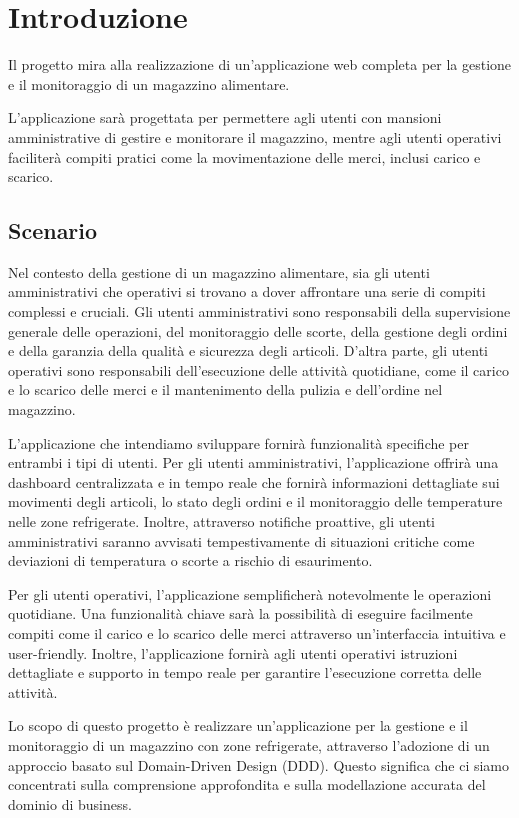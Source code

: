 \section{Introduzione}

Il progetto mira alla realizzazione di un'applicazione web completa per la gestione e il monitoraggio di un magazzino alimentare.

L'applicazione sarà progettata per permettere agli utenti con mansioni amministrative di gestire e monitorare il magazzino, mentre agli utenti operativi faciliterà compiti pratici come la movimentazione delle merci, inclusi carico e scarico.

\subsection{Scenario}

Nel contesto della gestione di un magazzino alimentare, sia gli utenti amministrativi che operativi si trovano a dover affrontare una serie di compiti complessi e cruciali. Gli utenti amministrativi sono responsabili della supervisione generale delle operazioni, del monitoraggio delle scorte, della gestione degli ordini e della garanzia della qualità e sicurezza degli articoli. D'altra parte, gli utenti operativi sono responsabili dell'esecuzione delle attività quotidiane, come il carico e lo scarico delle merci e il mantenimento della pulizia e dell'ordine nel magazzino.

L'applicazione che intendiamo sviluppare fornirà funzionalità specifiche per entrambi i tipi di utenti. Per gli utenti amministrativi, l'applicazione offrirà una dashboard centralizzata e in tempo reale che fornirà informazioni dettagliate sui movimenti degli articoli, lo stato degli ordini e il monitoraggio delle temperature nelle zone refrigerate. Inoltre, attraverso notifiche proattive, gli utenti amministrativi saranno avvisati tempestivamente di situazioni critiche come deviazioni di temperatura o scorte a rischio di esaurimento.

Per gli utenti operativi, l'applicazione semplificherà notevolmente le operazioni quotidiane. Una funzionalità chiave sarà la possibilità di eseguire facilmente compiti come il carico e lo scarico delle merci attraverso un'interfaccia intuitiva e user-friendly. Inoltre, l'applicazione fornirà agli utenti operativi istruzioni dettagliate e supporto in tempo reale per garantire l'esecuzione corretta delle attività.

Lo scopo di questo progetto è realizzare un'applicazione per la gestione e il monitoraggio di un magazzino con zone refrigerate, attraverso l'adozione di un approccio basato sul Domain-Driven Design (DDD). Questo significa che ci siamo concentrati sulla comprensione approfondita e sulla modellazione accurata del dominio di business.

